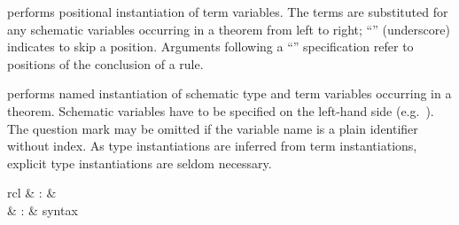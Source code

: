 \begin{isabellebody}
\begin{isamarkuptext}
\begin{descr}
  \item [\hyperlink{attribute.of}{\mbox{\isa{of}}}~\isa{{\isachardoublequote}t\isactrlsub {\isadigit{1}}\ {\isasymdots}\ t\isactrlsub n{\isachardoublequote}}] performs
  positional instantiation of term variables.  The terms  are substituted for any schematic
  variables occurring in a theorem from left to right; ``\isa{{\isacharunderscore}}''
  (underscore) indicates to skip a position.  Arguments following a
  ``'' specification refer to positions of the
  conclusion of a rule.
  
  \item [\hyperlink{attribute.where}{\mbox{\isa{where}}}~\isa{{\isachardoublequote}x\isactrlsub {\isadigit{1}}\ {\isacharequal}\ t\isactrlsub {\isadigit{1}}\ {\isasymAND}\ {\isasymdots}\ x\isactrlsub n\ {\isacharequal}\ t\isactrlsub n{\isachardoublequote}}] performs named instantiation of schematic
  type and term variables occurring in a theorem.  Schematic variables
  have to be specified on the left-hand side (e.g.\ ).
  The question mark may be omitted if the variable name is a plain
  identifier without index.  As type instantiations are inferred from
  term instantiations, explicit type instantiations are seldom
  necessary.

  \end{descr}%
\end{isamarkuptext}%
\isamarkuptrue%
%
\isamarkuptrue%
%
\begin{isamarkuptext}%
\begin{matharray}{rcl}
    \hypertarget{command.let}{\hyperlink{command.let}{\mbox{}}} & : &  \\
    \hypertarget{keyword.is}{\hyperlink{keyword.is}{\mbox{}}} & : & syntax \\
  \end{matharray}


\end{isamarkuptext}
\end{isabellebody}
